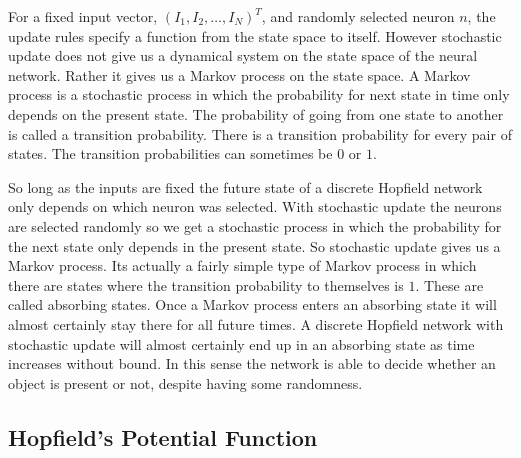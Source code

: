    For a fixed input vector, $(I_1, I_2, \ldots, I_N)^T$, and randomly selected
neuron $n$, the update rules specify a function from the state space to itself.
However stochastic update does not give us a dynamical system on the state 
space of the neural network.  Rather it gives us a Markov process on the state 
space.  A Markov process is a stochastic process in which the probability for
next state in time only depends on the present state.  The probability of 
going from one state to another is called a transition probability.  There is
a transition probability for every pair of states.  The transition 
probabilities can sometimes be $0$ or $1$.

   So long as the inputs are fixed the future state of a discrete Hopfield 
network only depends on which neuron was selected.  With stochastic update 
the neurons are selected randomly so we get a stochastic process in which the
probability for the next state only depends in the present state.  So 
stochastic update gives us a Markov process.  Its actually a fairly simple
type of Markov process in which there are states where the transition
probability to themselves is $1$.  These are called absorbing states.  Once a
Markov process enters an absorbing state it will almost certainly stay there
for all future times.  A discrete Hopfield network with stochastic update will 
almost certainly end up in an absorbing state as time increases without bound.
In this sense the network is able to decide whether an object is present or 
not, despite having some randomness.

\subsection{Hopfield's Potential Function}

